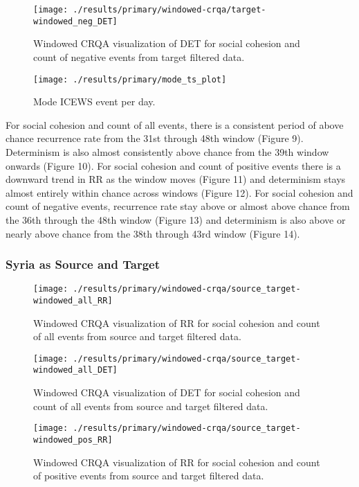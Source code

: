 \documentclass[english,man]{apa6}
\begin{document}
\begin{figure}
\texttt{[image: ./results/primary/windowed-crqa/target-windowed\_neg\_DET]} \caption{Windowed CRQA visualization of DET for social cohesion and count of negative events from target filtered data.}\label{fig:plot-DET-targ-neg}
\end{figure}

\begin{figure}
\texttt{[image: ./results/primary/mode\_ts\_plot]} \caption{Mode ICEWS event per day.}\label{fig:plot-mode-event}
\end{figure}

For social cohesion and count of all events, there is a consistent period of above chance recurrence rate from the 31st through 48th window (Figure 9). Determinism is also almost consistently above chance from the 39th window onwards (Figure 10). For social cohesion and count of positive events there is a downward trend in RR as the window moves (Figure 11) and determinism stays almost entirely within chance across windows (Figure 12). For social cohesion and count of negative events, recurrence rate stay above or almost above chance from the 36th through the 48th window (Figure 13) and determinism is also above or nearly above chance from the 38th through 43rd window (Figure 14).

\hypertarget{syria-as-source-and-target-1}{%
\subsubsection{Syria as Source and Target}\label{syria-as-source-and-target-1}}

\begin{figure}
\texttt{[image: ./results/primary/windowed-crqa/source\_target-windowed\_all\_RR]} \caption{Windowed CRQA visualization of RR for social cohesion and count of all events from source and target filtered data.}\label{fig:plot-RR-source-targ-all}
\end{figure}

\begin{figure}
\texttt{[image: ./results/primary/windowed-crqa/source\_target-windowed\_all\_DET]} \caption{Windowed CRQA visualization of DET for social cohesion and count of all events from source and target filtered data.}\label{fig:plot-DET-source-targ-all}
\end{figure}

\begin{figure}
\texttt{[image: ./results/primary/windowed-crqa/source\_target-windowed\_pos\_RR]} \caption{Windowed CRQA visualization of RR for social cohesion and count of positive events from source and target filtered data.}\label{fig:plot-RR-source-targ-pos}
\end{figure}
\end{document}
